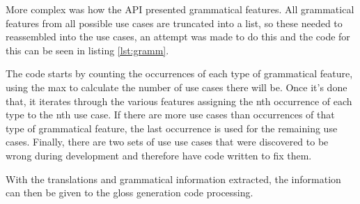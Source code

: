 

More complex was how the API presented grammatical features. All grammatical features from all possible use cases are truncated into a list, so these needed to reassembled into the use cases, an attempt was made to do this and the code for this can be seen in listing \ref{lst:gramm}.



The code starts by counting the occurrences of each type of grammatical feature, using the max to calculate the number of use cases there will be. Once it's done that, it iterates through the various features assigning the nth occurrence of each type to the nth use case. If there are more use cases than occurrences of that type of grammatical feature, the last occurrence is used for the remaining use cases. Finally, there are two sets of use use cases that were discovered to be wrong during development and therefore have code written to fix them. 

With the translations and grammatical information extracted, the information can then be given to the gloss generation code processing. 
